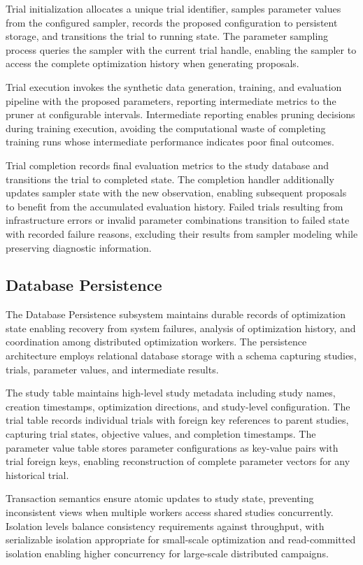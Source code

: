Trial initialization allocates a unique trial identifier, samples parameter values from the configured sampler, records the proposed configuration to persistent storage, and transitions the trial to running state. The parameter sampling process queries the sampler with the current trial handle, enabling the sampler to access the complete optimization history when generating proposals.

Trial execution invokes the synthetic data generation, training, and evaluation pipeline with the proposed parameters, reporting intermediate metrics to the pruner at configurable intervals. Intermediate reporting enables pruning decisions during training execution, avoiding the computational waste of completing training runs whose intermediate performance indicates poor final outcomes.

Trial completion records final evaluation metrics to the study database and transitions the trial to completed state. The completion handler additionally updates sampler state with the new observation, enabling subsequent proposals to benefit from the accumulated evaluation history. Failed trials resulting from infrastructure errors or invalid parameter combinations transition to failed state with recorded failure reasons, excluding their results from sampler modeling while preserving diagnostic information.

\subsection{Database Persistence}

The Database Persistence subsystem maintains durable records of optimization state enabling recovery from system failures, analysis of optimization history, and coordination among distributed optimization workers. The persistence architecture employs relational database storage with a schema capturing studies, trials, parameter values, and intermediate results.

The study table maintains high-level study metadata including study names, creation timestamps, optimization directions, and study-level configuration. The trial table records individual trials with foreign key references to parent studies, capturing trial states, objective values, and completion timestamps. The parameter value table stores parameter configurations as key-value pairs with trial foreign keys, enabling reconstruction of complete parameter vectors for any historical trial.

Transaction semantics ensure atomic updates to study state, preventing inconsistent views when multiple workers access shared studies concurrently. Isolation levels balance consistency requirements against throughput, with serializable isolation appropriate for small-scale optimization and read-committed isolation enabling higher concurrency for large-scale distributed campaigns.

